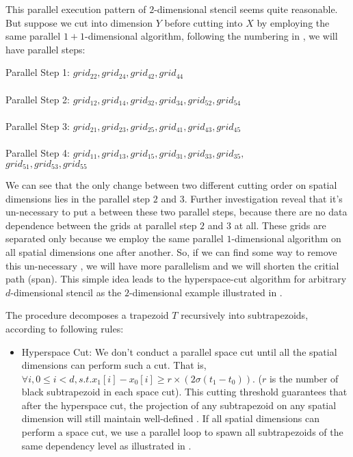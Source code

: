 {This parallel execution pattern of $2$-dimensional stencil seems quite reasonable.
But suppose we cut into dimension $Y$ before cutting into $X$ by employing the same parallel 
$1+1$-dimensional algorithm, following the numbering in , we will have parallel steps:

\begin{codebox}
Parallel Step 1:  $grid_{22}, grid_{24}, grid_{42}, grid_{44}$ \\
 \\
Parallel Step 2:  $grid_{12}, grid_{14}, grid_{32}, grid_{34}, grid_{52}, grid_{54}$ \\
 \\
Parallel Step 3:  $grid_{21}, grid_{23}, grid_{25}, grid_{41}, grid_{43}, grid_{45}$ \\
 \\
Parallel Step 4:  $grid_{11}, grid_{13}, grid_{15}, grid_{31}, grid_{33}, grid_{35},$ \\
$grid_{51}, grid_{53}, grid_{55}$ \\
\end{codebox}

We can see that the only change between two different cutting order on
spatial dimensions lies in the parallel step $2$ and $3$. Further
investigation reveal that it's un-necessary to put a 
between these two parallel steps, because there are no data dependence
between the grids at parallel step $2$ and $3$ at all. These grids are
separated only because we employ the same parallel $1$-dimensional
algorithm on all spatial dimensions one after another. So, if we can
find some way to remove this un-necessary , we will have
more parallelism and we will shorten the critial path (span). This
simple idea leads to the hyperspace-cut algorithm 
for arbitrary $d$-dimensional stencil as the $2$-dimensional example
illustrated in .

The procedure  decomposes a trapezoid $T$ recursively
into subtrapezoids, according to following rules:

\begin{itemize}

	\item Hyperspace Cut: We don't conduct a parallel
          space cut until all the spatial dimensions can perform such
          a cut. That is, $\forall i, 0 \leq i < d, s.t. x_1[i] - x_0[i]
          \geq r \times (2 \sigma (t_1 - t_0))$. ($r$ is the number of
          black subtrapezoid in each space cut). This cutting
          threshold guarantees that after the hyperspace cut,
          the projection of any subtrapezoid on any spatial dimension
          will still maintain well-defined .  
          If all spatial dimensions can perform a
          space cut, we use a parallel loop to spawn all
          subtrapezoids of the same dependency level as illustrated
          in .
	

\end{itemize}}
